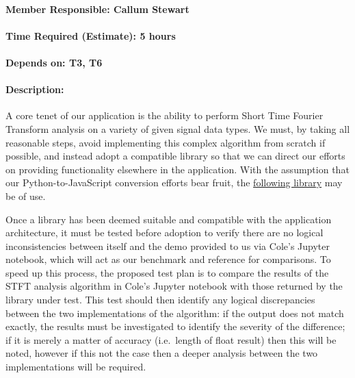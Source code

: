 \documentclass[
  paper=a4,
  ,captions=tableheading
]{scrartcl}
\begin{document}
\hypertarget{member-responsible-callum-stewart}{%
\paragraph{Member Responsible: Callum
Stewart}\label{member-responsible-callum-stewart}}

\hypertarget{time-required-estimate-5-hours}{%
\paragraph{Time Required (Estimate): 5
hours}\label{time-required-estimate-5-hours}}

\hypertarget{depends-on-t3-t6}{%
\paragraph{Depends on: T3, T6}\label{depends-on-t3-t6}}

\hypertarget{description}{%
\paragraph{Description:}\label{description}}
A core tenet of our application is the ability to perform Short Time Fourier Transform
analysis on a variety of given signal data types. We must, by taking all
reasonable steps, avoid implementing this complex algorithm from scratch
if possible, and instead adopt a compatible library so that we can
direct our efforts on providing functionality elsewhere in the
application. With the assumption that our Python-to-JavaScript
conversion efforts bear fruit, the
\href{https://docs.scipy.org/doc/scipy/reference/generated/scipy.signal.stft.html}{following library} may be of use.

Once a library has been deemed suitable and compatible with the
application architecture, it must be tested before adoption to verify
there are no logical inconsistencies between itself and the demo
provided to us via Cole's Jupyter notebook, which will act as our
benchmark and reference for comparisons. To speed up this process, the
proposed test plan is to compare the results of the STFT analysis
algorithm in Cole's Jupyter notebook with those returned by the library
under test. This test should then identify any logical discrepancies
between the two implementations of the algorithm: if the output does not
match exactly, the results must be investigated to identify the severity
of the difference; if it is merely a matter of accuracy (i.e.~length of
float result) then this will be noted, however if this not the case then
a deeper analysis between the two implementations will be required.
\end{document}
